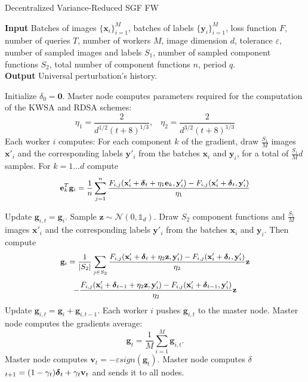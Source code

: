 \begin{algorithm}
	\caption{Decentralized Variance-Reduced SGF FW}\label{variance-reduced}
	\textbf{Input} Batches of images $\{\mathbf{x}_i\}_{i=1}^M$, batches of labels $\{\mathbf{y}_i\}_{i=1}^M$, loss function $F$, number of queries $T$, number of workers $M$, image dimension $d$, tolerance $\varepsilon$, number of sampled images and labels $S_1$, number of sampled component functions $S_2$, total number of component functions $n$, period $q$.\\
	\textbf{Output} Universal perturbation's history.
	\begin{algorithmic}[1]		
		\State Initialize \mbox{\boldmath$ \delta$}$_{0} = \mathbf{0}$.
		\State Master node computes parameters required for the computation of the KWSA and RDSA schemes: 
		{\scriptsize\[\eta_1 =\frac{2}{d^{1/2}(t+8)^{1/3}},\;\;\;\eta_2 =\frac{2}{d^{3/2}(t+8)^{1/3}}\]}
		\State Each worker $i$ computes:
		\State For each component $k$ of the gradient, draw $\frac{S_1}{M}$ images $\mathbf{x}'_i$ and the corresponding labels $\mathbf{y}'_i$ from the batches $\mathbf{x}_i$ and $\mathbf{y}_i$, for a total of $\frac{S_1}{M}d$ samples. For $k=1\dots d$ compute \newline
		\[\small \mathbf{e}_k^T\mathbf{g}_i = \frac{1}{n}\sum_{j=1}^{n}\frac{F_{i,j}(\mathbf{x}'_i + \mbox{\boldmath$ \delta$}_t + \eta_1\mathbf{e}_k, \mathbf{y}'_i) - F_{i,j}(\mathbf{x}'_i+\mbox{\boldmath$ \delta$}_t, \mathbf{y}'_i) }{\eta_1} \]
		
		\State Update $\mathbf{g}_{i,t} = \mathbf{g}_i$.
		\Else
		\State Sample $\mathbf{z} \sim\mathcal{N}(0,\mathbb{1}_d)$. Draw $S_2$ component functions and $\frac{S_1}{M}$ images $\mathbf{x}'_i$ and the corresponding labels $\mathbf{y}'_i$ from the batches $\mathbf{x}_i$ and $\mathbf{y}_i$. Then compute
		\[\small \mathbf{g}_i = \frac{1}{|S_2|}\sum_{j\in S_2}\frac{F_{i,j}(\mathbf{x}'_i + \mbox{\boldmath$ \delta$}_t + \eta_2\mathbf{z}, \mathbf{y}'_i) - F_{i,j}(\mathbf{x}'_i+\mbox{\boldmath$ \delta$}_t, \mathbf{y}'_i) }{\eta_2}\mathbf{z} \]
		\[\small-\frac{F_{i,j}(\mathbf{x}'_i + \mbox{\boldmath$ \delta$}_{t-1} + \eta_2\mathbf{z}, \mathbf{y}'_i) - F_{i,j}(\mathbf{x}'_i+\mbox{\boldmath$ \delta$}_{t-1}, \mathbf{y}'_i) }{\eta_2}\mathbf{z} \]
		\State Update $\mathbf{g}_{i,t} = \mathbf{g}_i +\mathbf{g}_{i,t-1} $.
		\EndIf
		\State Each worker $i$ pushes $\mathbf{g}_{i,t}$ to the master node.
		\State Master node computes the gradients average:
		\[\mathbf{g}_t = \frac{1}{M} \sum_{i=1}^{M} \mathbf{g}_{i,t}.\]
		\State Master node computes $\mathbf{v}_t = - \varepsilon sign(\mathbf{g}_t)$.
		\State Master node computes \mbox{\boldmath$ \delta$}$_{t+1} = (1-\gamma_t)\mbox{\boldmath$ \delta$}_t + \gamma_t\mathbf{v}_t$ and sends it to all nodes.
		\EndFor
	\end{algorithmic}
\end{algorithm}
